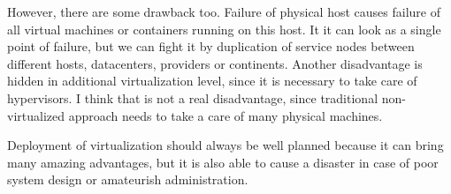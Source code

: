 However, there are some drawback too. Failure of physical host causes failure of all virtual machines or containers running on this host. It it can look as a single point of failure, but we can fight it by duplication of service nodes between different hosts, datacenters, providers or continents.
Another disadvantage is hidden in additional virtualization level, since it is necessary to take care of hypervisors. I think that is not a real disadvantage, since traditional non-virtualized approach needs to take a care of many physical machines.

Deployment of virtualization should always be well planned because it can bring many amazing advantages, but it is also able to cause a disaster in case of poor system design or amateurish administration.
